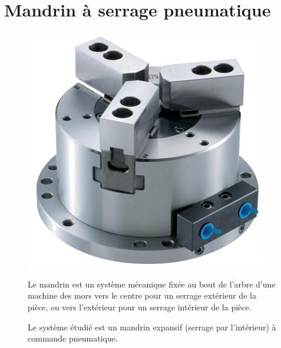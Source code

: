 

\section{Mandrin à serrage pneumatique}

\begin{figure}[!h]
  \begin{minipage}{0.35\linewidth}
  \centering\includegraphics[width=0.7\linewidth]{img/mandrin}
  \end{minipage}
  \hfill
  \begin{minipage}{0.60\linewidth}
Le mandrin est un système mécanique fixée au bout de l'arbre d'une machine des mors vers le centre pour un serrage extérieur de la pièce, ou vers l'extérieur pour un serrage intérieur de la pièce. 

Le système étudié est un mandrin expansif (serrage par l'intérieur) à commande pneumatique. 
  \end{minipage}
\end{figure}

